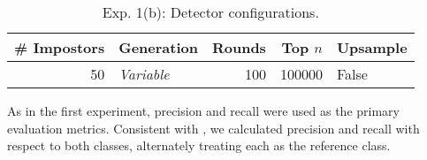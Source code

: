 \begin{table}[h]
\centering\small
\caption{Exp. 1(b): Detector configurations.}
\label{tab:repr_exp2}
\begin{tabular}{@{}rlrrl@{}}   %
\toprule
\# Impostors & Generation & Rounds & Top $n$ & Upsample \\
\midrule
50 & \textit{Variable} & 100 & \num{100000} & False \\
\bottomrule
\end{tabular}%
\end{table}

As in the first experiment, precision and recall were used as the primary evaluation metrics. 
Consistent with \citet{koppel_determining_2014}, we calculated precision and recall with respect to both classes, alternately treating each as the reference class.
